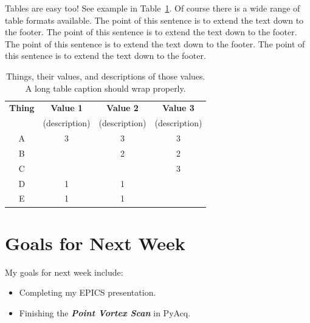 \documentclass[letterpaper,12pt]{article}
\begin{document}
Tables are easy too! See example in Table~\ref{table:example_table}. Of course there is a wide range of table formats available.   The point of this sentence is to extend the text down to the footer.  The point of this sentence is to extend the text down to the footer.  The point of this sentence is to extend the text down to the footer.  The point of this sentence is to extend the text down to the footer.  


\begin{table}[ht] %
\centering\setlength{\tabcolsep}{18pt}
\begin{tabular}{cccc}
\textbf{Thing} & \textbf{Value 1} & \textbf{Value 2} & \textbf{Value 3} \\
& (description) & (description) & (description)\\
\hline
A &  3 & 3 &  3     \\
B &      & 2 & 2\\
C &      &     & 3    \\
D & 1  & 1 &        \\
E & 1  & 1 &        \\
\hline
\end{tabular}
\caption{Things, their values, and descriptions of those values.  A long table caption should wrap properly.}
\label{table:example_table}
\end{table}

\section{Goals for Next Week}

My goals for next week include:
\begin{itemize}
    \item Completing my EPICS presentation.
    \item Finishing the \textbf{\textit{Point Vortex Scan}} in PyAcq.
\end{itemize}


 
\end{document}
